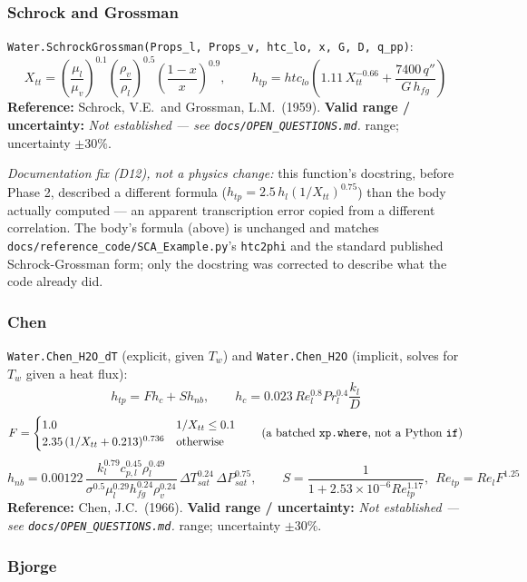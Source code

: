 \documentclass[11pt]{article}
\newcommand{\code}[1]{\texttt{#1}}
\newcommand{\notest}{\textit{Not established --- see \code{docs/OPEN\_QUESTIONS.md}.}}
\begin{document}
\subsubsection{Schrock and Grossman}

\code{Water.SchrockGrossman(Props\_l, Props\_v, htc\_lo, x, G, D, q\_pp)}:
\[
  X_{tt} = \left(\frac{\mu_l}{\mu_v}\right)^{0.1}\left(\frac{\rho_v}{\rho_l}\right)^{0.5}\left(\frac{1-x}{x}\right)^{0.9},
  \qquad h_{tp} = htc_{lo}\left(1.11\,X_{tt}^{-0.66} + \frac{7400\,q''}{G\,h_{fg}}\right)
\]
\textbf{Reference:} Schrock, V.E.\ and Grossman, L.M.\ (1959). \textbf{Valid range /
uncertainty:} \notest{} range; uncertainty $\pm30\%$.

\textit{Documentation fix (D12), not a physics change:} this function's docstring, before
Phase 2, described a different formula ($h_{tp}=2.5\,h_l(1/X_{tt})^{0.75}$) than the
body actually computed --- an apparent transcription error copied from a different
correlation. The body's formula (above) is unchanged and matches
\code{docs/reference\_code/SCA\_Example.py}'s \code{htc2phi} and the standard published
Schrock-Grossman form; only the docstring was corrected to describe what the code
already did.

\subsubsection{Chen}

\code{Water.Chen\_H2O\_dT} (explicit, given $T_w$) and \code{Water.Chen\_H2O} (implicit,
solves for $T_w$ given a heat flux):
\[
  h_{tp} = F h_c + S h_{nb}, \qquad h_c = 0.023\,Re_l^{0.8}Pr_l^{0.4}\frac{k_l}{D}
\]
\[
  F = \begin{cases}1.0 & 1/X_{tt}\le0.1\\ 2.35\,(1/X_{tt}+0.213)^{0.736} & \text{otherwise}\end{cases}
  \qquad (\text{a batched \code{xp.where}, not a Python \code{if}})
\]
\[
  h_{nb} = 0.00122\,\frac{k_l^{0.79}c_{p,l}^{0.45}\rho_l^{0.49}}{\sigma^{0.5}\mu_l^{0.29}h_{fg}^{0.24}\rho_v^{0.24}}\,\Delta T_{sat}^{0.24}\,\Delta P_{sat}^{0.75},
  \qquad S = \frac{1}{1+2.53\times10^{-6}Re_{tp}^{1.17}},\ \ Re_{tp}=Re_l F^{1.25}
\]
\textbf{Reference:} Chen, J.C.\ (1966). \textbf{Valid range / uncertainty:} \notest{}
range; uncertainty $\pm30\%$.

\subsubsection{Bjorge}
\end{document}
